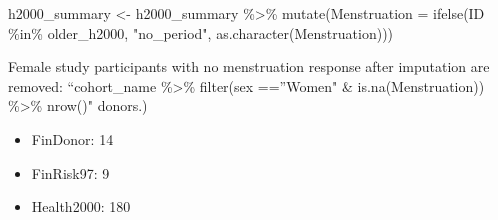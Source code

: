 \documentclass[
]{article}
\newenvironment{Shaded}{\begin{snugshade}}{\end{snugshade}}
\newcommand{\AttributeTok}[1]{\textcolor[rgb]{0.77,0.63,0.00}{#1}}
\newcommand{\FunctionTok}[1]{\textcolor[rgb]{0.00,0.00,0.00}{#1}}
\newcommand{\NormalTok}[1]{#1}
\newcommand{\OtherTok}[1]{\textcolor[rgb]{0.56,0.35,0.01}{#1}}
\newcommand{\SpecialCharTok}[1]{\textcolor[rgb]{0.00,0.00,0.00}{#1}}
\newcommand{\StringTok}[1]{\textcolor[rgb]{0.31,0.60,0.02}{#1}}
\providecommand{\tightlist}{%
  \setlength{\itemsep}{0pt}\setlength{\parskip}{0pt}}
\begin{document}
\begin{Shaded}
\begin{Highlighting}[]
\NormalTok{h2000\_summary }\OtherTok{\textless{}{-}}\NormalTok{ h2000\_summary }\SpecialCharTok{\%\textgreater{}\%}
  \FunctionTok{mutate}\NormalTok{(}\AttributeTok{Menstruation =} \FunctionTok{ifelse}\NormalTok{(ID }\SpecialCharTok{\%in\%}\NormalTok{ older\_h2000, }\StringTok{"no\_period"}\NormalTok{, }\FunctionTok{as.character}\NormalTok{(Menstruation)))}
\end{Highlighting}
\end{Shaded}

Female study participants with no menstruation response after imputation
are removed: ``cohort\_name \%\textgreater\% filter(sex ==''Women" \&
is.na(Menstruation)) \%\textgreater\% nrow()" donors.)

\begin{itemize}
\tightlist
\item
  FinDonor: 14
\item
  FinRisk97: 9
\item
  Health2000: 180
\end{itemize}
\end{document}
